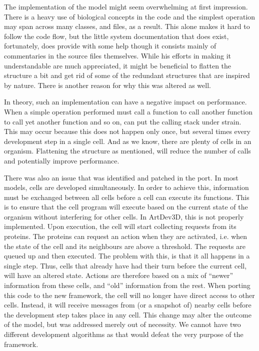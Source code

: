 The implementation of the model might seem overwhelming at first impression. There is a heavy use of biological concepts in the code and the simplest operation may span across many classes, and files, as a result. This alone makes it hard to follow the code flow, but the little system documentation that does exist, fortunately, does provide with some help though it consists mainly of commentaries in the source files themselves. While his efforts in making it understandable are much appreciated, it might be beneficial to flatten the structure a bit and get rid of some of the redundant structures that are inspired by nature. There is another reason for why this was altered as well.

In theory, such an implementation can have a negative impact on performance. When a simple operation performed must call a function to call another function to call yet another function and so on, can put the calling stack under strain. This may occur because this does not happen only once, but several times every development step in a single cell. And as we know, there are plenty of cells in an organism. Flattening the structure as mentioned, will reduce the number of calls and potentially improve performance.

There was also an issue that was identified and patched in the port. In most models, cells are developed simultaneously. In order to achieve this, information must be exchanged between all cells before a cell can execute its functions. This is to ensure that the cell program will execute based on the current state of the organism without interfering for other cells. In ArtDev3D, this is not properly implemented. Upon execution, the cell will start collecting requests from its proteins. The proteins can request an action when they are activated, i.e. when the state of the cell and its neighbours are above a threshold. The requests are queued up and then executed. The problem with this, is that it all happens in a single step. Thus, cells that already have had their turn before the current cell, will have an altered state. Actions are therefore based on a mix of ``newer'' information from these cells, and ``old'' information from the rest. When porting this code to the new framework, the cell will no longer have direct access to other cells. Instead, it will receive messages from (or a snapshot of) nearby cells before the development step takes place in any cell. This change may alter the outcome of the model, but was addressed merely out of necessity. We cannot have two different development algorithms as that would defeat the very purpose of the framework.


